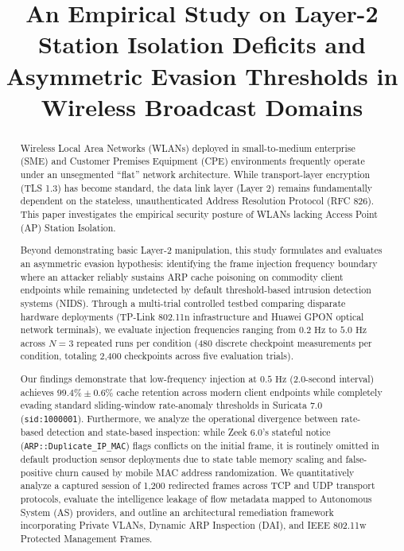 \documentclass[conference]{IEEEtran}
\begin{document}
\title{An Empirical Study on Layer-2 Station Isolation Deficits and Asymmetric Evasion Thresholds in Wireless Broadcast Domains}

\author{
}

\maketitle

\begin{abstract}
Wireless Local Area Networks (WLANs) deployed in small-to-medium enterprise (SME) and Customer Premises Equipment (CPE) environments frequently operate under an unsegmented ``flat'' network architecture. While transport-layer encryption (TLS 1.3) has become standard, the data link layer (Layer 2) remains fundamentally dependent on the stateless, unauthenticated Address Resolution Protocol (RFC 826). This paper investigates the empirical security posture of WLANs lacking Access Point (AP) Station Isolation. 

Beyond demonstrating basic Layer-2 manipulation, this study formulates and evaluates an asymmetric evasion hypothesis: identifying the frame injection frequency boundary where an attacker reliably sustains ARP cache poisoning on commodity client endpoints while remaining undetected by default threshold-based intrusion detection systems (NIDS). Through a multi-trial controlled testbed comparing disparate hardware deployments (TP-Link 802.11n infrastructure and Huawei GPON optical network terminals), we evaluate injection frequencies ranging from $0.2\text{ Hz}$ to $5.0\text{ Hz}$ across $N = 3$ repeated runs per condition (480 discrete checkpoint measurements per condition, totaling 2,400 checkpoints across five evaluation trials). 

Our findings demonstrate that low-frequency injection at $0.5\text{ Hz}$ (2.0-second interval) achieves $99.4\% \pm 0.6\%$ cache retention across modern client endpoints while completely evading standard sliding-window rate-anomaly thresholds in Suricata 7.0 (\texttt{sid:1000001}). Furthermore, we analyze the operational divergence between rate-based detection and state-based inspection: while Zeek 6.0's stateful notice (\texttt{ARP::Duplicate\_IP\_MAC}) flags conflicts on the initial frame, it is routinely omitted in default production sensor deployments due to state table memory scaling and false-positive churn caused by mobile MAC address randomization. We quantitatively analyze a captured session of 1,200 redirected frames across TCP and UDP transport protocols, evaluate the intelligence leakage of flow metadata mapped to Autonomous System (AS) providers, and outline an architectural remediation framework incorporating Private VLANs, Dynamic ARP Inspection (DAI), and IEEE 802.11w Protected Management Frames.
\end{abstract}
\end{document}
